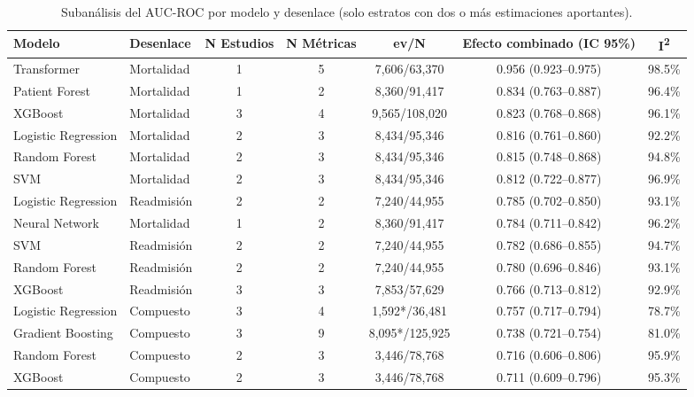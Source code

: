 \begin{table}[H]
\centering
\caption{Subanálisis del AUC-ROC por modelo y desenlace (solo estratos con dos o más estimaciones aportantes).}\label{tab:subgroup_ml}
\small
\begin{adjustbox}{max width=\textwidth}
\begin{tabular}{llccccc}
\toprule
\textbf{Modelo} & \textbf{Desenlace} & \textbf{N Estudios} & \textbf{N Métricas} & \textbf{ev/N} & \textbf{Efecto combinado (IC 95\%)} & \textbf{I\textsuperscript{2}} \\
\midrule
    Transformer & Mortalidad & 1 & 5 & 7,606/63,370 & 0.956 (0.923--0.975) & 98.5\% \\
    Patient Forest & Mortalidad & 1 & 2 & 8,360/91,417 & 0.834 (0.763--0.887) & 96.4\% \\
    XGBoost & Mortalidad & 3 & 4 & 9,565/108,020 & 0.823 (0.768--0.868) & 96.1\% \\
    Logistic Regression & Mortalidad & 2 & 3 & 8,434/95,346 & 0.816 (0.761--0.860) & 92.2\% \\
    Random Forest & Mortalidad & 2 & 3 & 8,434/95,346 & 0.815 (0.748--0.868) & 94.8\% \\
    SVM & Mortalidad & 2 & 3 & 8,434/95,346 & 0.812 (0.722--0.877) & 96.9\% \\
    Logistic Regression & Readmisión & 2 & 2 & 7,240/44,955 & 0.785 (0.702--0.850) & 93.1\% \\
    Neural Network & Mortalidad & 1 & 2 & 8,360/91,417 & 0.784 (0.711--0.842) & 96.2\% \\
    SVM & Readmisión & 2 & 2 & 7,240/44,955 & 0.782 (0.686--0.855) & 94.7\% \\
    Random Forest & Readmisión & 2 & 2 & 7,240/44,955 & 0.780 (0.696--0.846) & 93.1\% \\
    XGBoost & Readmisión & 3 & 3 & 7,853/57,629 & 0.766 (0.713--0.812) & 92.9\% \\
    Logistic Regression & Compuesto & 3 & 4 & 1,592*/36,481 & 0.757 (0.717--0.794) & 78.7\% \\
    Gradient Boosting & Compuesto & 3 & 9 & 8,095*/125,925 & 0.738 (0.721--0.754) & 81.0\% \\
    Random Forest & Compuesto & 2 & 3 & 3,446/78,768 & 0.716 (0.606--0.806) & 95.9\% \\
    XGBoost & Compuesto & 2 & 3 & 3,446/78,768 & 0.711 (0.609--0.796) & 95.3\% \\
\bottomrule
\end{tabular}
\end{adjustbox}

\end{table}
